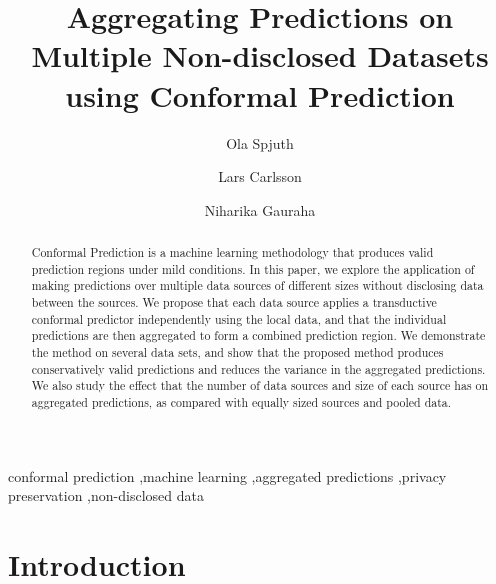 \documentclass[main]{subfiles}
\begin{document}
\begin{frontmatter}

\title{Aggregating Predictions on Multiple Non-disclosed Datasets using Conformal Prediction}

\author[label1]{Ola Spjuth}
\author[label2,label3]{Lars Carlsson}
\author[label1]{Niharika Gauraha}


\address[label1]{Department of Pharmaceutical Biosciences \\
       Uppsala University\\
       Uppsala, Sweden}
\address[label2]{Department of Computer Science, \\Royal Holloway, University of London, \\Egham Hill, Egham, Surrey, United Kingdom}
\address[label3]{Stena Line, Gothenburg, Sweden}


\begin{abstract}
Conformal Prediction is a machine learning methodology that produces valid prediction regions under mild conditions. 
In this paper, we explore the application of making predictions over multiple data sources of different sizes without disclosing data between the sources.
We propose that each data source applies a transductive conformal predictor independently using the local data, and that the individual predictions are then aggregated to form a combined prediction region. We demonstrate the method on several data sets, and show that the proposed method produces conservatively valid predictions and reduces the variance in the aggregated predictions. We also study the effect that the number of data sources and size of each source has on aggregated predictions, as compared with equally sized sources and pooled data.
\end{abstract}
\begin{keyword}


conformal prediction \sep machine learning \sep aggregated predictions \sep privacy preservation \sep non-disclosed data
\end{keyword}

\end{frontmatter}

\section{Introduction}
\end{document}
